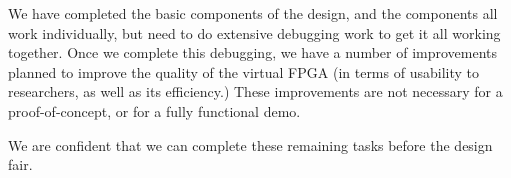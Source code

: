 \documentclass[12pt,letterpaper]{article}
\begin{document}
We have completed the basic components of the design, and the components all work individually, but need to do extensive debugging work to get it all working together.
Once we complete this debugging, we have a number of improvements planned to improve the quality of the virtual FPGA (in terms of usability to researchers, as well as its efficiency.)
These improvements are not necessary for a proof-of-concept, or for a fully functional demo.

We are confident that we can complete these remaining tasks before the design fair.



%
\end{document}
